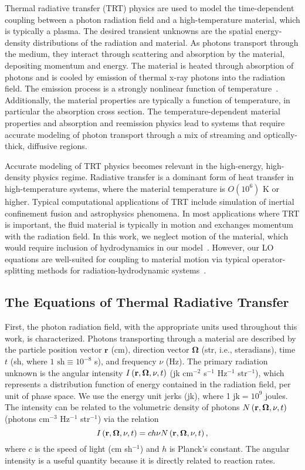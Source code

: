 Thermal radiative transfer (TRT) physics are used to model the time-dependent coupling between a photon
radiation field and a high-temperature material, which is typically a plasma.  The desired
transient unknowns are the spatial
energy-density distributions of the radiation and material.  As photons transport through
the medium, they interact through scattering and absorption by the material, depositing
momentum and energy.  The
material is heated through absorption of photons and is cooled by emission of thermal
x-ray photons
into the radiation field.  The emission process is a strongly nonlinear
function of temperature~\cite{mihalas}.  Additionally, the  material properties are
typically a function of temperature, in particular the absorption cross section.  The
temperature-dependent material properties and
absorption and reemission physics lead to systems that require accurate modeling of
photon transport through a mix of
streaming and optically-thick, diffusive regions. 

Accurate modeling of TRT physics becomes relevant in the high-energy,
high-density physics regime.   Radiative transfer is a dominant form of heat transfer in
high-temperature systems, where the material temperature is $O(10^6)$ K or
higher. Typical computational applications of TRT include simulation of inertial confinement fusion and
astrophysics phenomena.  In most applications where TRT is important, the fluid
material is typically in motion and exchanges momentum with the radiation field. In this work, we neglect
motion of the material, which would require inclusion of hydrodynamics in our
model~\cite{mihalas}.  However, our LO equations are well-suited for
coupling to material motion via typical operator-splitting methods for
radiation-hydrodynamic systems~\cite{radhydro_code,os_rh}.

\subsection{The Equations of Thermal Radiative Transfer}

First, the photon radiation field, with the appropriate units used throughout this work, is
characterized.  Photons transporting through a material are described by the particle position vector
$\mathbf{r}$ (cm), direction vector $\mathbf\Omega$ (str, i.e., steradians),
time $t$ (sh, where $1\text{ sh}\equiv10^{-8}$ s), and frequency $\nu$ (Hz).  The primary
radiation unknown is the angular intensity $I \left(\mathbf{r},\mathbf{\Omega},\nu,t\right)$ (jk cm$^{-2}$ s$^{-1}$
Hz$^{-1}$ str$^{-1}$), which represents a distribution
function of energy
contained in the radiation field, per unit of
phase space.  We use the energy unit jerks (jk), where 1 $\text{jk}= 10^9$ joules. The intensity can be related to the volumetric density of photons
$N \left(\mathbf{r},\mathbf{\Omega},\nu,t\right)$ (photons cm$^{-3}$ Hz$^{-1}$ str$^{-1}$) via the relation
\begin{equation}\label{eq:intens_dens}
    I\left(\mathbf{r},\mathbf{\Omega},\nu,t\right) = c h \nu N \left(\mathbf{r},\mathbf{\Omega},\nu,t\right),
\end{equation}
where $c$ is the speed of light (cm sh$^{-1}$) and $h$ is Planck's constant. The
angular intensity is a useful quantity because it is directly related to reaction rates.


